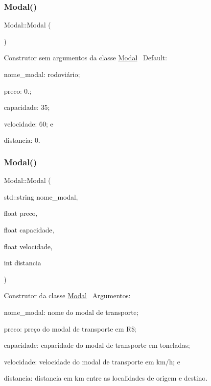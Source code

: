 \subsubsection{\texorpdfstring{Modal()}{Modal()}\hspace{0.1cm}{\footnotesize\ttfamily [1/2]}}
{\footnotesize\ttfamily Modal\+::\+Modal (\begin{DoxyParamCaption}{ }\end{DoxyParamCaption})}

Construtor sem argumentos da classe \hyperlink{classModal}{Modal}~\newline
Default\+:
\begin{DoxyItemize}
\item nome\+\_\+modal\+: rodoviário;
\item preco\+: 0.;
\item capacidade\+: 35;
\item velocidade\+: 60; e
\item distancia\+: 0.~\newline

\end{DoxyItemize}\mbox{\label{classModal_a17560766811007d0af99fd6099325d52}} 
\subsubsection{\texorpdfstring{Modal()}{Modal()}\hspace{0.1cm}{\footnotesize\ttfamily [2/2]}}
{\footnotesize\ttfamily Modal\+::\+Modal (\begin{DoxyParamCaption}\item[{std\+::string}]{nome\+\_\+modal,  }\item[{float}]{preco,  }\item[{float}]{capacidade,  }\item[{float}]{velocidade,  }\item[{int}]{distancia }\end{DoxyParamCaption})}

Construtor da classe \hyperlink{classModal}{Modal}~\newline
 Argumentos\+:
\begin{DoxyItemize}
\item nome\+\_\+modal\+: nome do modal de transporte;
\item preco\+: preço do modal de transporte em R\$;
\item capacidade\+: capacidade do modal de transporte em toneladas;
\item velocidade\+: velocidade do modal de transporte em km/h; e
\item distancia\+: distancia em km entre as localidades de origem e destino.~\newline

\end{DoxyItemize}\mbox{\label{classModal_a4a2e7830211c07075078b5d5186dab54}} 
